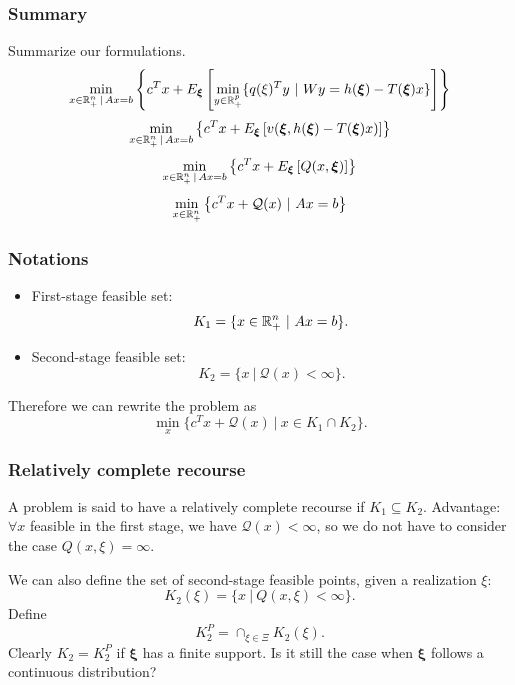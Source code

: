 \documentclass{beamer}
\def\bxi{\boldsymbol\xi}
\def\bxi{\boldsymbol\xi}
\begin{document}
\begin{frame}
\frametitle{Summary}

Summarize our formulations.
\[
\min_{x \in \rit^n_+ \,|\, Ax = b} \left\lbrace c^Tx + E_{\bxi} \left[ \min_{y \in \rit^p_+} \lbrace q(\xi)^Ty \ |\ Wy = h(\bxi) - T(\bxi)x \rbrace \right] \right\rbrace 
\]
\[
\min_{x \in \rit^n_+ \,|\, Ax = b} \left\lbrace c^Tx + E_{\bxi}
  \left[  v(\bxi, h(\bxi)-T(\bxi)x) \right] \right\rbrace 
\]
\[
\min_{x \in \rit^n_+ \,|\, Ax = b} \left\lbrace c^Tx + E_{\bxi} \left[ Q(x,\bxi) \right] \right\rbrace 
\]
\[
\min_{x \in \mathbb{R}^n_+} \left\lbrace c^Tx + \mathcal{Q}(x)
  \ |\ Ax = b \right\rbrace 
\]

\end{frame}

\begin{frame}
\frametitle{Notations}

\begin{itemize}
\item
First-stage feasible set:
\[
K_1 = \lbrace x \in \mathbb{R}^n_+ \ |\ Ax = b \rbrace.
\]
\item
Second-stage feasible set:
\[
K_2 = \lbrace x \ |\ \mathcal{Q}(x) < \infty \rbrace.
\]
\end{itemize}

\mbox{}

Therefore we can rewrite the problem as
\[
\min_x \lbrace c^Tx + \mathcal{Q}(x) \ |\ x \in K_1 \cap K_2 \rbrace.
\]

\end{frame}

\begin{frame}
\frametitle{Relatively complete recourse}

A problem is said to have a {\red relatively complete recourse} if $K_1
\subseteq K_2$.
Advantage: $\forall x$ feasible in the first stage, we have $\mathcal{Q}(x) < \infty$, so we do not have to consider the case $Q(x, \xi) = \infty$.

\mbox{}

We can also define the set of second-stage feasible points, given a realization $\xi$:
\[
K_2(\xi) = \lbrace x \ |\ Q(x,\xi) < \infty \rbrace.
\]
Define
\[
K_2^P = \cap_{\xi \in \Xi} K_2(\xi).
\]
Clearly $K_2 = K_2^P$ if $\bxi$ has a finite support.
Is it still the case when $\bxi$ follows a continuous distribution?

\end{frame}
\end{document}
